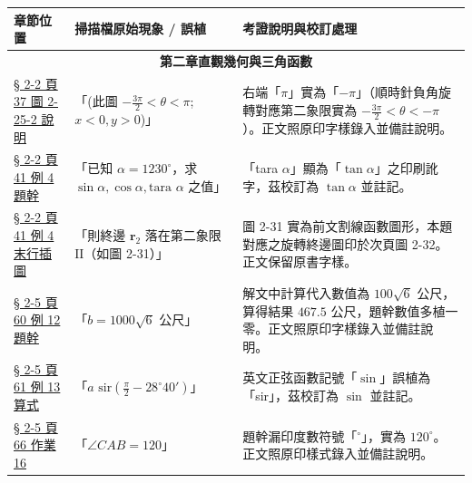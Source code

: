 \documentclass[a4paper,12pt,twoside]{article}
\begin{document}
\begin{table}[H]
\centering
\small
\renewcommand{\arraystretch}{1.35}
\begin{tabularx}{\textwidth}{|p{3.0cm}|p{3.8cm}|X|}
\hline
\textbf{章節位置} & \textbf{掃描檔原始現象 / 誤植} & \textbf{考證說明與校訂處理} \\ \hline

\multicolumn{3}{|c|}{\textbf{第二章\quad 直觀幾何與三角函數}} \\ \hline

\hyperref[note:b3s-ch2-p37-fig2-25-2]{§ 2-2 頁 37 圖 2-25-2 說明} & 
「(此圖 $-\frac{3\pi}{2} < \theta < \pi$; $x<0, y>0$)」 & 
右端「$\pi$」實為「$-\pi$」（順時針負角旋轉對應第二象限實為 $-\frac{3\pi}{2} < \theta < -\pi$）。正文照原印字樣錄入並備註說明。 \\ \hline

\hyperref[note:b3s-ch2-p41-ex4-typo]{§ 2-2 頁 41 例 4 題幹} & 
「已知 $\alpha = 1230^\circ$，求 $\sin\alpha, \cos\alpha, \text{tara }\alpha$ 之值」 & 
「tara $\alpha$」顯為「$\tan\alpha$」之印刷訛字，茲校訂為 $\tan\alpha$ 並註記。 \\ \hline

\hyperref[note:b3s-ch2-p41-ref-fig31]{§ 2-2 頁 41 例 4 末行插圖} & 
「則終邊 $\mathbf{r}_2$ 落在第二象限 $\mathrm{II}$（如圖 2-31）」 & 
圖 2-31 實為前文割線函數圖形，本題對應之旋轉終邊圖印於次頁圖 2-32。正文保留原書字樣。 \\ \hline

\hyperref[note:b3s-ch2-p60-ex12-data]{§ 2-5 頁 60 例 12 題幹} & 
「$b = 1000\sqrt{6}$ 公尺」 & 
解文中計算代入數值為 $100\sqrt{6}$ 公尺，算得結果 $467.5$ 公尺，題幹數值多植一零。正文照原印字樣錄入並備註說明。 \\ \hline

\hyperref[note:b3s-ch2-p61-ex13-sir]{§ 2-5 頁 61 例 13 算式} & 
「$a\text{ sir}(\frac{\pi}{2} - 28^\circ 40')$」 & 
英文正弦函數記號「$\sin$」誤植為「sir」，茲校訂為 $\sin$ 並註記。 \\ \hline

\hyperref[note:b3s-ch2-p66-homework16-deg]{§ 2-5 頁 66 作業 16} & 
「$\angle CAB = 120$」 & 
題幹漏印度數符號「$^\circ$」，實為 $120^\circ$。正文照原印樣式錄入並備註說明。 \\ \hline

\end{tabularx}
\end{table}
\end{document}
